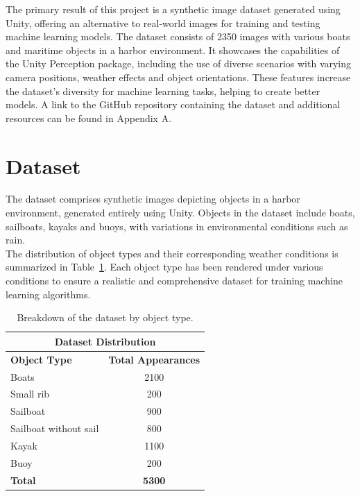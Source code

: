 The primary result of this project is a synthetic image dataset generated using Unity, offering an alternative to real-world images for training and testing machine learning models. The dataset consists of 2350 images with various boats and maritime objects in a harbor environment. It showcases the capabilities of the Unity Perception package, including the use of diverse scenarios with varying camera positions, weather effects and object orientations. These features increase the dataset's diversity for machine learning tasks, helping to create better models. A link to the GitHub repository containing the dataset and additional resources can be found in Appendix A.

\section{Dataset}
The dataset comprises synthetic images depicting objects in a harbor environment, generated entirely using Unity. Objects in the dataset include boats, sailboats, kayaks and buoys, with variations in environmental conditions such as rain.\\

\noindent The distribution of object types and their corresponding weather conditions is summarized in Table~\ref{tab:dataset_composition}. Each object type has been rendered under various conditions to ensure a realistic and comprehensive dataset for training machine learning algorithms.
 
\begin{table}[H]
\centering
\begin{tabular}{|l|c|}
\hline
\multicolumn{2}{|c|}{\textbf{Dataset Distribution}} \\ 
\hline
\textbf{Object Type} & \textbf{Total Appearances}\\ 
\hline
Boats         & 2100  \\ 
Small rib     & 200 \\
Sailboat      & 900     \\
Sailboat without sail     & 800    \\
Kayak        & 1100     \\ 
Buoy         & 200     \\ 

\hline
\textbf{Total}       & \textbf{5300} \\ 
\hline
\end{tabular}
\caption{Breakdown of the dataset by object type.}
\label{tab:dataset_composition}
\end{table}



